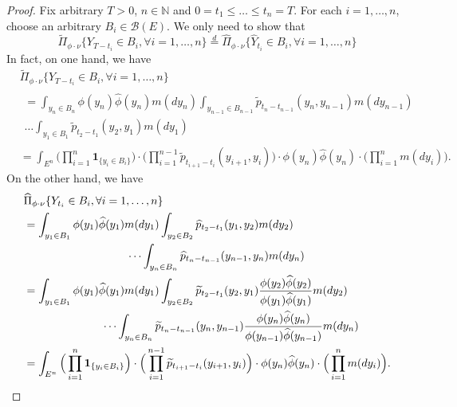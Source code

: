 \documentclass[12pt,a4paper]{amsart}
\numberwithin{equation}{section}
\theoremstyle{plain}
\theoremstyle{definition}
\begin{document}
\begin{proof}
	Fix arbitrary $T>0$, $n \in \mathbb N$ and $0= t_1\leq \dots \leq t_n = T$.
	For each $i=1,\dots, n$, choose an arbitrary $B_i \in \mathscr B(E)$.
	We only need to show that
  \[
    \widetilde \Pi_{\phi \cdot \nu}\{Y_{T-t_i}\in B_i,\forall i=1,\dots, n\}
    \overset{d}{=}\widehat \Pi_{\phi \cdot \nu}\{\widehat Y_{t_i}\in B_i,\forall i=1,\dots, n\}
  \]
	In fact, on one hand, we have
  \begin{align}
    &\widetilde \Pi_{\phi \cdot \nu}\{Y_{T-t_i}\in B_i,\forall i=1,\dots, n\}
    \\&\begin{multlined} =\int_{y_n\in B_n} \phi(y_n)\widehat\phi(y_n) m(dy_n)\int_{y_{n-1}\in B_{n-1}} \widetilde p_{t_n - t_{n-1}}(y_n,y_{n-1})m(dy_{n-1})
    \\ \dots \int_{y_1\in B_1} \widetilde p_{t_2 - t_1}(y_2,y_1)m(dy_1) \end{multlined}
    \\&= \int_{E^n} \Big(\prod_{i=1}^n \mathbf 1_{\{y_i\in B_i\}}\Big)\cdot\Big(\prod_{i=1}^{n-1} \widetilde p_{t_{i+1}-t_i}(y_{i+1},y_i)\Big)\cdot\phi(y_n)\widehat\phi(y_n)\cdot \Big(\prod_{i=1}^nm(dy_i)\Big).
  \end{align}
	On the other hand, we have
  \begin{align}
    &\widehat \Pi_{\phi\cdot\nu}\{Y_{t_i}\in B_i, \forall i = 1,\dots, n\}
    \\&\begin{multlined} = \int_{y_1\in B_1} \phi(y_1)\widehat \phi(y_1)m(dy_1) \int_{y_2\in B_2} \widehat p_{t_2-t_1}(y_1,y_2)m(dy_2)
    \\ \dots\int_{y_n\in B_n}\widehat p_{t_n-t_{n-1}}(y_{n-1},y_n)m(dy_n) \end{multlined}
    \\&\begin{multlined} = \int_{y_1\in  B_1} \phi(y_1)\widehat \phi(y_1)m(dy_1) \int_{y_2\in B_2} \widetilde p_{t_2-t_1}(y_2,y_1)\frac{\phi(y_2)\widehat \phi(y_2)}{\phi(y_1)\widehat \phi(y_1)}m(dy_2)
    \\ \dots\int_{y_n\in B_n}\widetilde p_{t_n-t_{n-1}}(y_n,y_{n-1})\frac{\phi(y_n)\widehat\phi(y_n)}{\phi(y_{n-1})\widehat\phi(y_{n-1})}m(dy_n) \end{multlined}
    \\&= \int_{E^n} \Big(\prod_{i=1}^n \mathbf 1_{\{y_i\in B_i\}}\Big)\cdot\Big(\prod_{i=1}^{n-1} \widetilde p_{t_{i+1}-t_i}(y_{i+1},y_i)\Big)\cdot\phi(y_n)\widehat\phi(y_n)\cdot \Big(\prod_{i=1}^n m(dy_i)\Big).
    \qedhere
  \end{align}
\end{proof}
\end{document}
